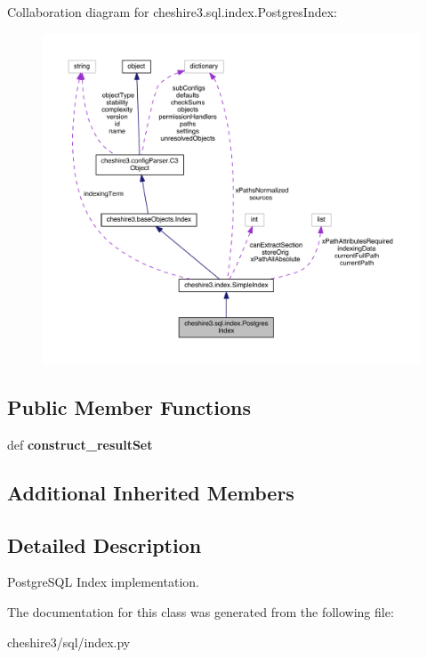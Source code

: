Collaboration diagram for cheshire3.\-sql.\-index.\-Postgres\-Index\-:
\nopagebreak
\begin{figure}[H]
\begin{center}
\leavevmode
\includegraphics[width=350pt]{classcheshire3_1_1sql_1_1index_1_1_postgres_index__coll__graph}
\end{center}
\end{figure}
\subsection*{Public Member Functions}
\begin{DoxyCompactItemize}
\item 
\hypertarget{classcheshire3_1_1sql_1_1index_1_1_postgres_index_ad24b668de07d037440e5280c944f9127}{def {\bfseries construct\-\_\-result\-Set}}\label{classcheshire3_1_1sql_1_1index_1_1_postgres_index_ad24b668de07d037440e5280c944f9127}

\end{DoxyCompactItemize}
\subsection*{Additional Inherited Members}


\subsection{Detailed Description}
\begin{DoxyVerb}PostgreSQL Index implementation.\end{DoxyVerb}
 

The documentation for this class was generated from the following file\-:\begin{DoxyCompactItemize}
\item 
cheshire3/sql/index.\-py\end{DoxyCompactItemize}
